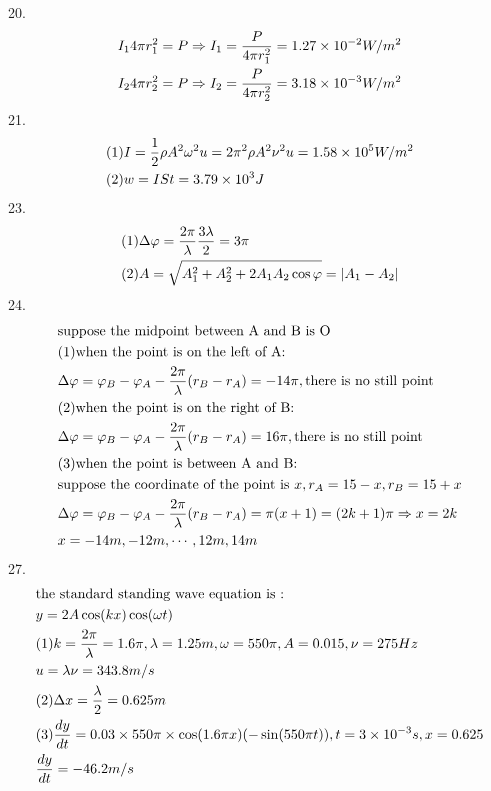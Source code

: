 \documentclass{article}
\begin{document}
20.\[\begin{gathered}
{I_1}4\pi r_1^2 = P \Rightarrow {I_1} = \frac{P}{{4\pi r_1^2}} = 1.27 \times {10^{ - 2}}W/{m^2} \hfill \\
{I_2}4\pi r_2^2 = P \Rightarrow {I_2} = \frac{P}{{4\pi r_2^2}} = 3.18 \times {10^{ - 3}}W/{m^2} \hfill \\ 
\end{gathered} \]
21.\[\begin{gathered}
(1)I = \frac{1}{2}\rho {A^2}{\omega ^2}u = 2{\pi ^2}\rho {A^2}{\nu ^2}u = 1.58 \times {10^5}W/{m^2} \hfill \\
(2)w = ISt = 3.79 \times {10^3}J \hfill \\ 
\end{gathered} \]
23.\[\begin{gathered}
(1)\Delta \varphi  = \frac{{2\pi }}{\lambda }\frac{{3\lambda }}{2} = 3\pi  \hfill \\
(2)A = \sqrt {A_1^2 + A_2^2 + 2{A_1}{A_2}\cos \varphi }  = |{A_1} - {A_2}| \hfill \\ 
\end{gathered} \]
24.\[\begin{gathered}
{\text{suppose the midpoint between A and B is O}} \hfill \\
{\text{(1)when the point is on the left of A:}} \hfill \\
\Delta \varphi  = {\varphi _B} - {\varphi _A} - \frac{{2\pi }}{\lambda }({r_B} - {r_A}) =  - 14\pi ,{\text{there is no still point}} \hfill \\
{\text{(2)when the point is on the right of B:}} \hfill \\
\Delta \varphi  = {\varphi _B} - {\varphi _A} - \frac{{2\pi }}{\lambda }({r_B} - {r_A}) = 16\pi ,{\text{there is no still point}} \hfill \\
{\text{(3)when the point is between A and B:}} \hfill \\
{\text{suppose the coordinate of the point is }}x,{r_A} = 15 - x,{r_B} = 15 + x \hfill \\
\Delta \varphi  = {\varphi _B} - {\varphi _A} - \frac{{2\pi }}{\lambda }({r_B} - {r_A}) = \pi (x + 1) = (2k + 1)\pi  \Rightarrow x = 2k \hfill \\
x =  - 14m, - 12m, \cdots ,12m,14m \hfill \\ 
\end{gathered} \]
27.\[\begin{gathered}
{\text{the standard standing wave equation is :}} \hfill \\
y = 2A\cos (kx)\cos (\omega t) \hfill \\
(1)k = \frac{{2\pi }}{\lambda } = 1.6\pi ,\lambda  = 1.25m,\omega  = 550\pi ,A = 0.015,\nu  = 275Hz \hfill \\
u = \lambda \nu  = 343.8m/s \hfill \\
(2)\Delta x = \frac{\lambda }{2} = 0.625m \hfill \\
(3)\frac{{dy}}{{dt}} = 0.03 \times 550\pi  \times \cos (1.6\pi x)( - \sin (550\pi t)),t = 3 \times {10^{ - 3}}s,x = 0.625 \hfill \\
\frac{{dy}}{{dt}} =  - 46.2m/s \hfill \\ 
\end{gathered} \]
\end{document}
